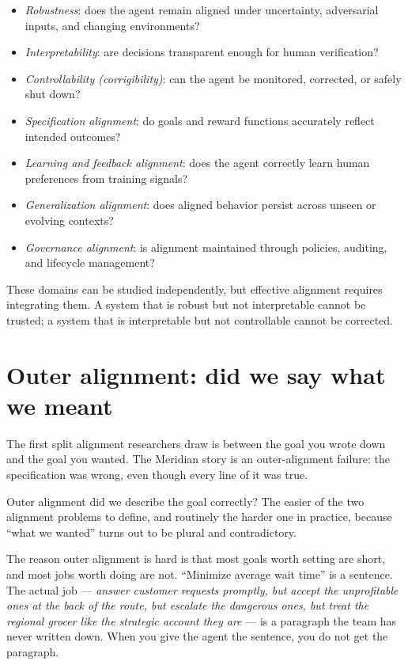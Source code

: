 \begin{itemize}
\item \textit{Robustness}: does the agent remain aligned under uncertainty, adversarial inputs, and changing environments?
\item \textit{Interpretability}: are decisions transparent enough for human verification?
\item \textit{Controllability (corrigibility)}: can the agent be monitored, corrected, or safely shut down?
\item \textit{Specification alignment}: do goals and reward functions accurately reflect intended outcomes?
\item \textit{Learning and feedback alignment}: does the agent correctly learn human preferences from training signals?
\item \textit{Generalization alignment}: does aligned behavior persist across unseen or evolving contexts?
\item \textit{Governance alignment}: is alignment maintained through policies, auditing, and lifecycle management?
\end{itemize}

These domains can be studied independently, but effective alignment requires integrating them. A system that is robust but not interpretable cannot be trusted; a system that is interpretable but not controllable cannot be corrected.

\section{Outer alignment: did we say what we meant}

The first split alignment researchers draw is between the goal you wrote down and the goal you wanted. The Meridian story is an outer-alignment failure: the specification was wrong, even though every line of it was true.

\begin{TNdefinition}{Outer alignment} did we describe the goal correctly? The easier of the two alignment problems to define, and routinely the harder one in practice, because ``what we wanted'' turns out to be plural and contradictory. \end{TNdefinition}

The reason outer alignment is hard is that most goals worth setting are short, and most jobs worth doing are not. ``Minimize average wait time'' is a sentence. The actual job --- \textit{answer customer requests promptly, but accept the unprofitable ones at the back of the route, but escalate the dangerous ones, but treat the regional grocer like the strategic account they are} --- is a paragraph the team has never written down. When you give the agent the sentence, you do not get the paragraph.

